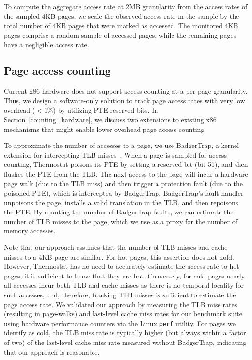 To compute the aggregate access rate at 2MB granularity from the access rates of the sampled
4KB pages, we scale the observed access rate in the sample by the total number
of 4KB pages that were marked as accessed. The monitored 4KB pages comprise a 
random sample of accessed pages, while the remaining pages have a negligible
access rate.

\subsection{Page access counting}
\label{section:access-counting}
Current x86 hardware does not support access counting at a per-page granularity.
Thus, we design a software-only solution to track page access rates with very
low overhead ($<$1\%) by utilizing PTE reserved bits. In
Section~\ref{counting_hardware}, we discuss two extensions to existing x86
mechanisms that might enable lower overhead page access counting.

To approximate the number of accesses to a page, we use BadgerTrap, a kernel
extension for intercepting TLB misses~\cite{ref:badgertrap}. When a page is
sampled for access counting, Thermostat poisons its PTE by setting a reserved
bit (bit 51), and then flushes the PTE from the TLB.  The next access to the
page will incur a hardware page walk (due to the TLB miss) and then trigger a
protection fault (due to the poisoned PTE), which is intercepted by BadgerTrap.
BadgerTrap's fault handler unpoisons the page, installs a valid translation in
the TLB, and then repoisons the PTE. By counting the number of BadgerTrap
faults, we can estimate the number of TLB misses to the
page, which we use as a proxy for the number of memory accesses.

Note that our approach assumes that the number of TLB misses and 
cache misses to a 4KB page are similar.  For hot pages, this assertion does not
hold.  However, Thermostat has no need to accurately estimate the access rate
to hot pages; it is sufficient to know that they are hot.  Conversely, for cold pages
nearly all accesses incur both TLB and cache misses as there is no temporal
locality for such accesses, and, therefore, tracking
TLB misses is sufficient to estimate the page access rate. We validated our 
approach by measuring
the TLB miss rates (resulting in page-walks) and last-level cache miss rates for
our benchmark suite using hardware performance counters via the Linux {\tt perf}
utility. For pages we identify as cold, the TLB miss rate is typically higher (but
always within a factor of two) of the last-level cache miss rate measured
without BadgerTrap, indicating that our approach is reasonable.

